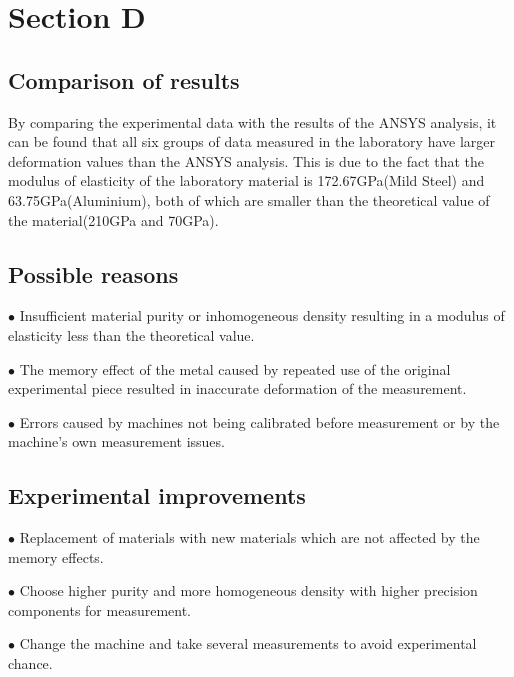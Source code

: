 \section*{Section D}
\label{sec:Section D}
\FloatBarrier %


\subsection*{Comparison of results}

By comparing the experimental data with the results of the ANSYS analysis, 
it can be found that all six groups of data measured in the laboratory have 
larger deformation values than the ANSYS analysis. This is due to the fact 
that the modulus of elasticity of the laboratory material is 172.67GPa(Mild Steel) and 63.75GPa(Aluminium), 
both of which are smaller than the theoretical value of the material(210GPa and 70GPa).


\subsection*{Possible reasons}
$\bullet$ Insufficient material purity or inhomogeneous density 
resulting in a modulus of elasticity less than the theoretical value.

$\bullet$ The memory effect of the metal caused by repeated use of the original 
experimental piece resulted in inaccurate deformation of the measurement.

$\bullet$ Errors caused by machines not being calibrated before measurement or 
by the machine's own measurement issues.

\subsection*{Experimental improvements}

$\bullet$ Replacement of materials with new materials which are not affected by 
the memory effects.

$\bullet$ Choose higher purity and more homogeneous density with higher precision 
components for measurement.

$\bullet$ Change the machine and take several measurements to avoid experimental chance.